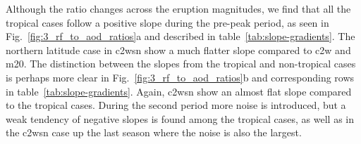 \documentclass{ametsocV6.1}
\begin{document}
Although the ratio changes across the eruption magnitudes, we find that all the tropical
cases follow a positive slope during the pre-peak period, as seen in
Fig.~\ref{fig:3_rf_to_aod_ratios}a and described in table~\ref{tab:slope-gradients}. The
northern latitude case in \gls{c2wsn} show a much flatter slope compared to \gls{c2w}
and \gls{m20}. The distinction between the slopes from the tropical and non-tropical
cases is perhaps more clear in Fig.~\ref{fig:3_rf_to_aod_ratios}b and corresponding rows
in table~\ref{tab:slope-gradients}. Again, \gls{c2wsn} show an almost flat slope
compared to the tropical cases. During the second period more noise is introduced, but a
weak tendency of negative slopes is found among the tropical cases, as well as in the
\gls{c2wsn} case up the last season where the noise is also the largest.
\end{document}
